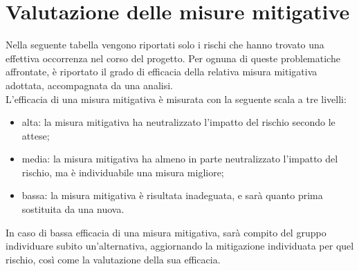 \section{Valutazione delle misure mitigative}
Nella seguente tabella vengono riportati solo i rischi che hanno trovato una effettiva occorrenza nel corso del progetto. Per ognuna di queste problematiche affrontate, è riportato il grado di efficacia della relativa misura mitigativa adottata, accompagnata da una analisi.\\
L'efficacia di una misura mitigativa è misurata con la seguente scala a tre livelli:
\begin{itemize}
    \item alta: la misura mitigativa ha neutralizzato l'impatto del rischio secondo le attese;
    \item media: la misura mitigativa ha almeno in parte neutralizzato l'impatto del rischio, ma è individuabile una misura migliore;
    \item bassa: la misura mitigativa è risultata inadeguata, e sarà quanto prima sostituita da una nuova.
\end{itemize}
In caso di bassa efficacia di una misura mitigativa, sarà compito del gruppo individuare subito un'alternativa, aggiornando la mitigazione individuata per quel rischio, così come la valutazione della sua efficacia.\\ \\

